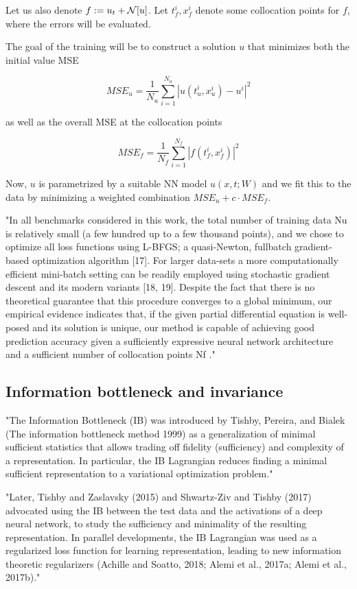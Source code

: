 \documentclass[english]{article}
\begin{document}
Let us also denote $f:=u_t +\mathcal{N}[u]$. Let $t_f^i,x_f^i$ denote some collocation points for $f$, where the errors will be evaluated. 

The goal of the training will be to construct a solution $u$ that minimizes both the initial value MSE

$$MSE_u = \frac{1}{N_u}\sum_{i=1}^{N_u}|u(t_u^i,x_u^i)-u^i|^2$$

as well as the overall MSE at the collocation points

$$MSE_f = \frac{1}{N_f}\sum_{i=1}^{N_f}|f(t_f^i,x_f^i)|^2$$

\item Now, $u$ is parametrized by a suitable NN model $u(x,t;W)$ and we fit this to the data by minimizing a weighted combination $MSE_u +c\cdot MSE_f$.

"In all benchmarks considered in this work, the total number of training
data Nu is relatively small (a few hundred up to a few thousand points), and
we chose to optimize all loss functions using L-BFGS; a quasi-Newton, fullbatch gradient-based optimization algorithm [17]. For larger data-sets a more
computationally efficient mini-batch setting can be readily employed using
stochastic gradient descent and its modern variants [18, 19]. Despite the
fact that there is no theoretical guarantee that this procedure converges to
a global minimum, our empirical evidence indicates that, if the given partial
differential equation is well-posed and its solution is unique, our method is
capable of achieving good prediction accuracy given a sufficiently expressive
neural network architecture and a sufficient number of collocation points Nf ." 
\eitem 



\subsection{Information bottleneck and invariance}
%
\bitem
\item "The Information Bottleneck (IB) was introduced by Tishby, Pereira, and Bialek (The information bottleneck method 1999) as a generalization
of minimal sufficient statistics that allows trading off fidelity (sufficiency) and complexity
of a representation. In particular, the IB Lagrangian reduces finding a minimal sufficient
representation to a variational optimization problem." 

"Later, Tishby and Zaslavsky (2015)
and Shwartz-Ziv and Tishby (2017) advocated using the IB between the test data and the
activations of a deep neural network, to study the sufficiency and minimality of the resulting
representation. In parallel developments, the IB Lagrangian was used as a regularized
loss function for learning representation, leading to new information theoretic regularizers
(Achille and Soatto, 2018; Alemi et al., 2017a; Alemi et al., 2017b)."
\end{document}
